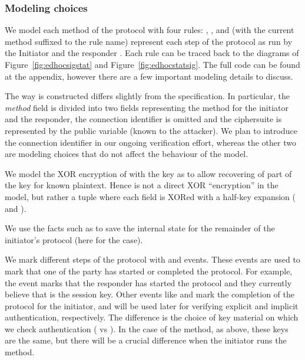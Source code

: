 \subsubsection{Modeling choices}

We model each method of the protocol with four rules: , , 
and  (with the current method suffixed to the rule name) represent each
step of the protocol as run by the Initiator  and the responder .
Each rule can be traced back to the diagrams of Figure~\ref{fig:edhocsigstat}
and Figure~\ref{fig:edhocstatsig}.
%
The full code can be found at the appendix, however there are a few important
modeling details to discuss.

The way  is constructed differs slightly from the specification. In
particular, the \emph{method} field is divided into two fields representing the
method for the initiator and the responder, the connection identifier is omitted
and the ciphersuite is represented by the public variable
 (known to the attacker). We plan to introduce the connection
identifier \mCi in our ongoing verification effort, whereas the other two are
modeling choices that do not affect the behaviour of the model.

We model the XOR encryption of  with the key  as to
allow recovering of part of the key for known plaintext.
%
Hence  is not a direct XOR ``encryption'' in the model, but
rather a tuple where each field is XORed with a half-key expansion (
and ).

We use the facts such as  %
to save the internal state for the remainder of the initiator's protocol (here
for the \mPskPsk{} case).

We mark different steps of the protocol with  and 
events. These events are used to mark that one of the party has started or
completed the protocol.
%
For example, the event  %
marks that the responder has started the protocol and they currently believe
that  is the session key.
%
Other events like  %
and  mark the completion of the protocol for
the initiator, and will be used later for verifying explicit and implicit
authentication, respectively.  The difference is the choice of key material on
which we check authentication ( vs ). In the case of the
\mSig{} method, as above, these keys are the same, but there will be a crucial
difference when the initiator runs the \mStat{} method.

